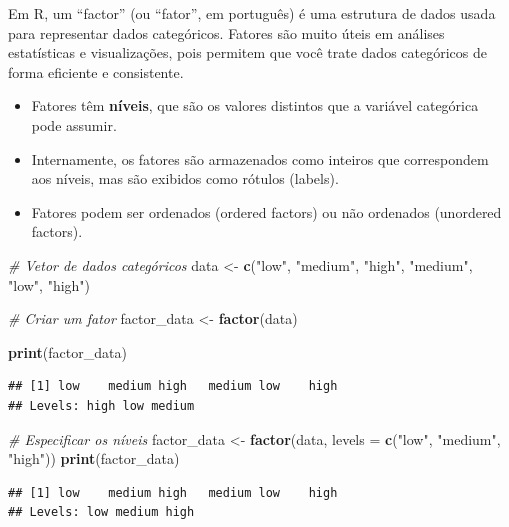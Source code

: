 \documentclass[
]{book}
\newenvironment{Shaded}{\begin{snugshade}}{\end{snugshade}}
\newcommand{\AttributeTok}[1]{\textcolor[rgb]{0.13,0.29,0.53}{#1}}
\newcommand{\CommentTok}[1]{\textcolor[rgb]{0.56,0.35,0.01}{\textit{#1}}}
\newcommand{\FunctionTok}[1]{\textcolor[rgb]{0.13,0.29,0.53}{\textbf{#1}}}
\newcommand{\NormalTok}[1]{#1}
\newcommand{\OtherTok}[1]{\textcolor[rgb]{0.56,0.35,0.01}{#1}}
\newcommand{\StringTok}[1]{\textcolor[rgb]{0.31,0.60,0.02}{#1}}
\begin{document}
Em R, um ``factor'' (ou ``fator'', em português) é uma estrutura de dados usada para representar dados categóricos. Fatores são muito úteis em análises estatísticas e visualizações, pois permitem que você trate dados categóricos de forma eficiente e consistente.

\begin{itemize}
\item
  Fatores têm \textbf{níveis}, que são os valores distintos que a variável categórica pode assumir.
\item
  Internamente, os fatores são armazenados como inteiros que correspondem aos níveis, mas são exibidos como rótulos (labels).
\item
  Fatores podem ser ordenados (ordered factors) ou não ordenados (unordered factors).
\end{itemize}

\begin{Shaded}
\begin{Highlighting}[]
\CommentTok{\# Vetor de dados categóricos}
\NormalTok{data }\OtherTok{\textless{}{-}} \FunctionTok{c}\NormalTok{(}\StringTok{"low"}\NormalTok{, }\StringTok{"medium"}\NormalTok{, }\StringTok{"high"}\NormalTok{, }\StringTok{"medium"}\NormalTok{, }\StringTok{"low"}\NormalTok{, }\StringTok{"high"}\NormalTok{)}

\CommentTok{\# Criar um fator}
\NormalTok{factor\_data }\OtherTok{\textless{}{-}} \FunctionTok{factor}\NormalTok{(data)}

\FunctionTok{print}\NormalTok{(factor\_data)}
\end{Highlighting}
\end{Shaded}

\begin{verbatim}
## [1] low    medium high   medium low    high  
## Levels: high low medium
\end{verbatim}

\begin{Shaded}
\begin{Highlighting}[]
\CommentTok{\# Especificar os níveis}
\NormalTok{factor\_data }\OtherTok{\textless{}{-}} \FunctionTok{factor}\NormalTok{(data, }\AttributeTok{levels =} \FunctionTok{c}\NormalTok{(}\StringTok{"low"}\NormalTok{, }\StringTok{"medium"}\NormalTok{, }\StringTok{"high"}\NormalTok{))}
\FunctionTok{print}\NormalTok{(factor\_data)}
\end{Highlighting}
\end{Shaded}

\begin{verbatim}
## [1] low    medium high   medium low    high  
## Levels: low medium high
\end{verbatim}
\end{document}
